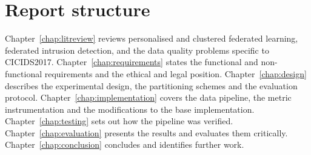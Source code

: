 \section{Report structure}
\label{sec:structure}

Chapter~\ref{chap:litreview} reviews personalised and clustered federated
learning, federated intrusion detection, and the data quality problems specific
to CICIDS2017. Chapter~\ref{chap:requirements} states the functional and
non-functional requirements and the ethical and legal position.
Chapter~\ref{chap:design} describes the experimental design, the partitioning
schemes and the evaluation protocol. Chapter~\ref{chap:implementation} covers
the data pipeline, the metric instrumentation and the modifications to the base
implementation. Chapter~\ref{chap:testing} sets out how the pipeline was
verified. Chapter~\ref{chap:evaluation} presents the results and evaluates them
critically. Chapter~\ref{chap:conclusion} concludes and identifies further
work.
